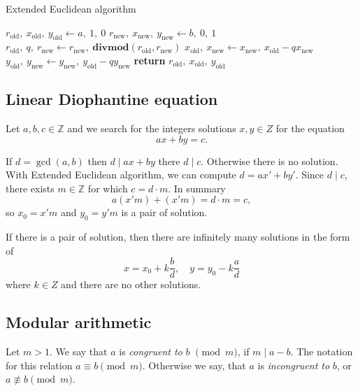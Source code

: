 \documentclass{article}
\newcommand{\Z}{\mathbb{Z}}
\newcommand*{\divmod}[2]{\mathbf{divmod}\left( #1, #2 \right)}
\begin{document}
\begin{algorithm}
    \caption{Extended Euclidean algorithm}
    \label{alg:extended-gcd}
    \begin{algorithmic}[1]
            \State $r_{\mathrm{old}},\ x_{\mathrm{old}},\ y_{\mathrm{old}} \gets a,\ 1,\ 0$
            \State $r_{\mathrm{new}},\ x_{\mathrm{new}},\ y_{\mathrm{new}} \gets b,\ 0,\ 1$
                \State $r_{\mathrm{old}},\ q,\ r_{\mathrm{new}} \gets r_{\mathrm{new}},\ \divmod{r_{\mathrm{old}}}{r_{\mathrm{new}}}$
                \State $x_{\mathrm{old}},\ x_{\mathrm{new}} \gets x_{\mathrm{new}},\ x_{\mathrm{old}} - q x_{\mathrm{new}}$
                \State $y_{\mathrm{old}},\ y_{\mathrm{new}} \gets y_{\mathrm{new}},\ y_{\mathrm{old}} - q y_{\mathrm{new}}$
            \EndWhile
            \State \textbf{return} $r_{\mathrm{old}},\ x_{\mathrm{old}},\ y_{\mathrm{old}}$
        \EndProcedure
    \end{algorithmic}
\end{algorithm}

\subsection{Linear Diophantine equation}

Let $a,b,c \in \Z$ and we search for the integers solutions $x,y \in Z$ for the equation
\[
    ax + by = c.
\]

If $d = \gcd(a, b)$ then $d \mid ax + by$ there $d \mid c$. Otherwise there is no solution.
With Extended Euclidean algorithm, we can compute $d = ax' + by'$.
Since $d \mid c$, there exists $m \in \Z$ for which $c = d \cdot m$.
In summary
\[
    a \left(x'm\right) + \left(x'm\right) = d\cdot m = c,
\]
so $x_0 = x'm$ and $y_0 = y'm$ is a pair of solution.

If there is a pair of solution, then there are infinitely many solutions in the form of
\[
    x = x_0 + k\frac{b}{d}, \quad y = y_0 - k\frac{a}{d}
\]
where $k \in Z$ and there are no other solutions.

\subsection{Modular arithmetic}

Let $m > 1$. We say that $a$ is \emph{congruent to} $b$ $\pmod{m}$, if $m \mid a - b$.
The notation for this relation $a \equiv b \pmod{m}$.
Otherwise we say, that $a$ is \emph{incongruent to} $b$, or $a \not\equiv b \pmod{m}$.
\end{document}
